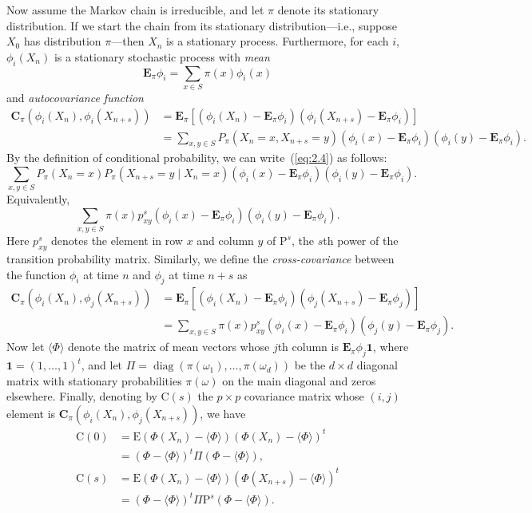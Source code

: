 \documentclass[12pt,letterpaper]{report}
\theoremstyle{plain}
\theoremstyle{definition}
\theoremstyle{remark}
\numberwithin{theorem}{chapter}
\numberwithin{claim}{chapter}
\numberwithin{equation}{chapter}
\numberwithin{conjecture}{chapter}
\newcommand\bC{\ensuremath{\mathbf{C}}}
\newcommand\C{\ensuremath{\mathrm{C}}}
\renewcommand\P{\ensuremath{\mathrm{P}}}
\newcommand\E{\ensuremath{\mathrm{E}}}
\newcommand\bE{\ensuremath{\mathbf{E}}}
\newcommand\<{\ensuremath{\langle}}
\renewcommand\>{\ensuremath{\rangle}}
\newcommand\diag{\ensuremath{\operatorname{diag}}}
\newcommand\one{\ensuremath{\mathbf{1}}}
\begin{document}
Now assume the Markov chain is irreducible, and let $\pi$ denote its stationary distribution.
If we start the chain from its stationary distribution---i.e., suppose $X_0$ has
distribution $\pi$---then $X_n$ is a stationary process. 
Furthermore, for each $i$, $\phi_i(X_n)$ is a stationary stochastic process with
\emph{mean}
\[
\bE_\pi\phi_i = \sum_{x\in S} \pi(x)\phi_i(x)
\]
and \emph{autocovariance function}
\begin{align}
\bC_\pi (\phi_i(X_n),  \phi_i (X_{n+s})) 
&= \bE_\pi[(\phi_i(X_n) - \bE_\pi\phi_i)(\phi_i(X_{n+s}) - \bE_\pi\phi_i)]\\
&= \sum_{x, y\in S} P_\pi(X_n = x, X_{n+s} = y) (\phi_i(x)- \bE_\pi\phi_i)(\phi_i(y) - \bE_\pi\phi_i).\nonumber
\end{align}
By the definition of conditional probability, we can write~(\ref{eq:2.4}) as follows:
\[
\sum_{x, y\in S} P_\pi(X_n = x) P_\pi(X_{n+s} = y\mid X_n = x) (\phi_i(x)-
\bE_\pi\phi_i)(\phi_i(y) - \bE_\pi\phi_i).
\]
Equivalently,
\[
\sum_{x, y\in S} \pi(x)p^s_{xy} (\phi_i(x)-\bE_\pi\phi_i)(\phi_i(y) - \bE_\pi\phi_i).
\]
Here $p^s_{xy}$ denotes the element in row $x$ and column $y$ of $\P^s$, the
$s$th power of the transition probability matrix. 
Similarly, we define the \emph{cross-covariance} between the function 
$\phi_i$ at time $n$ and $\phi_j$ at time $n+s$ as
\begin{align}
\bC_\pi (\phi_i(X_n),  \phi_j (X_{n+s})) 
&= \bE_\pi[(\phi_i(X_n) - \bE_\pi\phi_i)(\phi_j(X_{n+s}) - \bE_\pi\phi_j)]\nonumber\\
&= \sum_{x, y\in S} \pi(x)p^s_{xy} (\phi_i(x)-\bE_\pi\phi_i)(\phi_j(y) - \bE_\pi\phi_j).
\end{align}
Now let $\<\Phi\>$ denote the matrix of mean vectors whose $j$th column is 
$\bE_\pi\phi_j\one$, where $\one = (1,\dots, 1)^t$,
and let $\Pi = \diag(\pi(\omega_1),\dots, \pi(\omega_d))$ be the $d \times d$
diagonal matrix with stationary probabilities $\pi(\omega)$
on the main diagonal and zeros elsewhere. 
Finally, denoting by $\C(s)$ the $p \times p$ covariance matrix
whose $(i,j)$ element is $\bC_\pi(\phi_i(X_n), \phi_j(X_{n+s}))$, we have
\begin{align*}
\C(0) &= \E(\Phi(X_n) - \<\Phi\>)(\Phi(X_n) - \<\Phi\>)^t\\
&= (\Phi - \<\Phi\>)^t\Pi (\Phi-\<\Phi\>), \\
\C(s) &= \E(\Phi(X_n) - \<\Phi\>)(\Phi(X_{n+s}) - \<\Phi\>)^t\\
&= (\Phi - \<\Phi\>)^t \Pi \P^s (\Phi - \<\Phi\>).
\end{align*}
\end{document}
